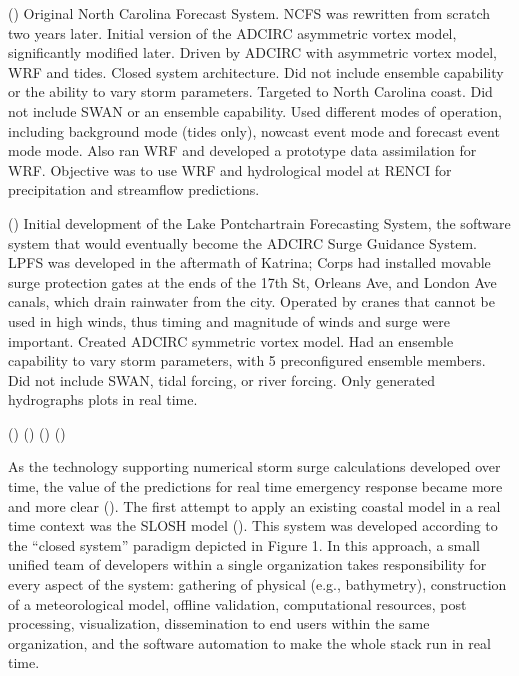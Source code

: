 \documentclass[12pt]{article}
\begin{document}
(\cite{MattocksC2006}) Original North Carolina Forecast System. NCFS 
was rewritten from scratch two years later. Initial version of the 
ADCIRC asymmetric vortex model, significantly modified later. Driven 
by ADCIRC with asymmetric vortex model, WRF and tides. Closed system 
architecture.  Did not include ensemble capability or the ability to 
vary storm parameters. Targeted to North Carolina coast. Did not 
include SWAN or an ensemble capability. Used different modes of 
operation, including background mode (tides only), nowcast event 
mode and forecast event mode mode. Also ran WRF and developed a 
prototype data assimilation for WRF. Objective was to use WRF and 
hydrological model at RENCI for precipitation and streamflow 
predictions.

(\cite{FlemingJG2008}) Initial development of the Lake Pontchartrain 
Forecasting System, the software system that would eventually become 
the ADCIRC Surge Guidance System. LPFS was developed in the 
aftermath of Katrina; Corps had installed movable surge protection 
gates at the ends of the 17th St, Orleans Ave, and London Ave 
canals, which drain rainwater from the city. Operated by cranes that 
cannot be used in high winds, thus timing and magnitude of winds and 
surge were important. Created ADCIRC symmetric vortex model. Had an 
ensemble capability to vary storm parameters, with 5 preconfigured 
ensemble members. Did not include SWAN, tidal forcing, or river 
forcing. Only generated hydrographs plots in real time. 


(\cite {BlainCA1998}) (\cite{BlainCA2002}) (\cite{BlainCA2002}) (\cite {BlainCA2002Tidal})



As the technology supporting numerical storm surge calculations 
developed over time, the value of the predictions for real time 
emergency response became more and more clear (\cite 
{JelesnianskiCP1992}). The first attempt to apply an existing 
coastal model in a real time context was the SLOSH model (\cite 
{JelesnianskiCP1992}). This system was developed according to the 
``closed system'' paradigm depicted in Figure 1. In this approach, a 
small unified team of developers within a single organization takes 
responsibility for every aspect of the system: gathering of physical 
(e.g., bathymetry), construction of a meteorological model, offline 
validation, computational resources, post processing, visualization, 
dissemination to end users within the same organization, and the 
software automation to make the whole stack run in real time. 
\end{document}
